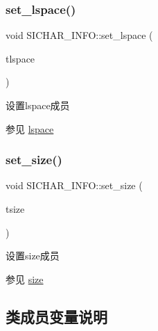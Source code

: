 \subsubsection{\texorpdfstring{set\+\_\+lspace()}{set\_lspace()}}
{\footnotesize\ttfamily void S\+I\+C\+H\+A\+R\+\_\+\+I\+N\+F\+O\+::set\+\_\+lspace (\begin{DoxyParamCaption}\item[{L\+I\+N\+E\+S\+P\+A\+CE}]{tlspace }\end{DoxyParamCaption})\hspace{0.3cm}{\ttfamily [inline]}}



设置lspace成员 

\begin{DoxySeeAlso}{参见}
\hyperlink{class_s_i_c_h_a_r___i_n_f_o_ace4bad34a55f914a2fbbdeb8f9a22bae}{lspace} 
\end{DoxySeeAlso}
\mbox{\label{class_s_i_c_h_a_r___i_n_f_o_afe883164593a8d3a5c9377eb5454c9f1}} 
\subsubsection{\texorpdfstring{set\+\_\+size()}{set\_size()}}
{\footnotesize\ttfamily void S\+I\+C\+H\+A\+R\+\_\+\+I\+N\+F\+O\+::set\+\_\+size (\begin{DoxyParamCaption}\item[{C\+H\+A\+R\+S\+I\+ZE}]{tsize }\end{DoxyParamCaption})\hspace{0.3cm}{\ttfamily [inline]}}



设置size成员 

\begin{DoxySeeAlso}{参见}
\hyperlink{class_s_i_c_h_a_r___i_n_f_o_abcc72d98471148d54e334f9528103a50}{size} 
\end{DoxySeeAlso}


\subsection{类成员变量说明}
\mbox{\label{class_s_i_c_h_a_r___i_n_f_o_a8d998c494943882d98981f79f620460d}} 
